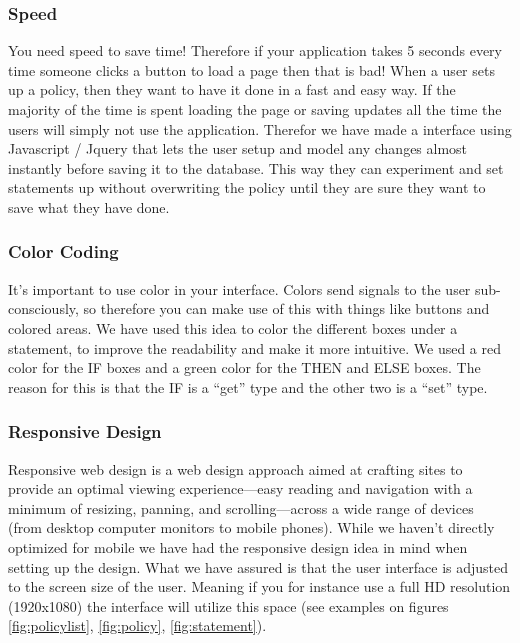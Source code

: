 \subsubsection{Speed}
You need speed to save time! Therefore if your application takes 5 seconds every time someone clicks a button to load a page then that is bad! When a user sets up a policy, then they want to have it done in a fast and easy way. If the majority of the time is spent loading the page or saving updates all the time the users will simply not use the application. Therefor we have made a interface using Javascript / Jquery that lets the user setup and model any changes almost instantly before saving it to the database. This way they can experiment and set statements up without overwriting the policy until they are sure they want to save what they have done.

\subsubsection{Color Coding}
It's important to use color in your interface. Colors send signals to the user sub-consciously, so therefore you can make use of this with things like buttons and colored areas. We have used this idea to color the different boxes under a statement, to improve the readability and make it more intuitive. We used a red color for the IF boxes and a green color for the THEN and ELSE boxes. The reason for this is that the IF is a "`get"' type and the other two is a "`set"' type.

\subsubsection{Responsive Design}
Responsive web design is a web design approach aimed at crafting sites to provide an optimal viewing experience—easy reading and navigation with a minimum of resizing, panning, and scrolling—across a wide range of devices (from desktop computer monitors to mobile phones). While we haven't directly optimized for mobile we have had the responsive design idea in mind when setting up the design. What we have assured is that the user interface is adjusted to the screen size of the user. Meaning if you for instance use a full HD resolution (1920x1080) the interface will utilize this space (see examples on figures \ref{fig:policylist}, \ref{fig:policy}, \ref{fig:statement}).

